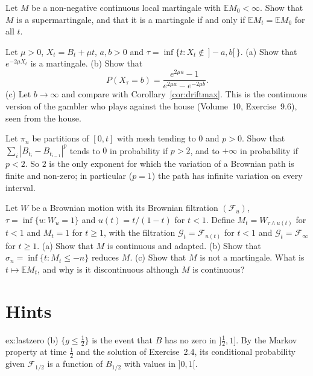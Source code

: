 \begin{exercise}[$\star\star$]\label{ex:superm}
Let $M$ be a non-negative continuous local martingale with $\mathbb EM_0<\infty$. Show that $M$ is a supermartingale, and that it is a martingale if and only if $\mathbb EM_t=\mathbb EM_0$ for all $t$.
\end{exercise}

\begin{exercise}[$\star\star$]\label{ex:driftruin}
Let $\mu>0$, $X_t=B_t+\mu t$, $a,b>0$ and $\tau=\inf\{t:X_t\notin\,]-a,b[\,\}$. (a) Show that $e^{-2\mu X_t}$ is a martingale. (b) Show that
\[
P(X_\tau=b)=\frac{e^{2\mu a}-1}{e^{2\mu a}-e^{-2\mu b}}.
\]
(c) Let $b\to\infty$ and compare with Corollary~\ref{cor:driftmax}. This is the continuous version of the gambler who plays against the house (Volume~10, Exercise~9.6), seen from the house.
\end{exercise}

\begin{exercise}[$\star$]\label{ex:pvariation}
Let $\pi_n$ be partitions of $[0,t]$ with mesh tending to $0$ and $p>0$. Show that $\sum_i|B_{t_i}-B_{t_{i-1}}|^p$ tends to $0$ in probability if $p>2$, and to $+\infty$ in probability if $p<2$. So $2$ is the only exponent for which
the variation of a Brownian path is finite and non-zero; in particular ($p=1$) the path has infinite variation on every interval.
\end{exercise}

\begin{exercise}[$\star\star\star$]\label{ex:strict}
Let $W$ be a Brownian motion with its Brownian filtration $(\mathcal F_u)$, $\tau=\inf\{u:W_u=1\}$ and $u(t)=t/(1-t)$ for $t<1$. Define $M_t=W_{\tau\wedge u(t)}$ for $t<1$ and $M_t=1$ for $t\ge1$, with the
filtration $\mathcal G_t=\mathcal F_{u(t)}$ for $t<1$ and $\mathcal G_t=\mathcal F_\infty$ for $t\ge1$. (a) Show that $M$ is continuous and adapted. (b) Show that $\sigma_n=\inf\{t:M_t\le-n\}$ reduces $M$. (c) Show
that $M$ is not a martingale. What is $t\mapsto\mathbb EM_t$, and why is it discontinuous although $M$ is continuous?
\end{exercise}

\section{Hints}

\begin{hint}{ex:lastzero}
(b) $\{g\le\frac12\}$ is the event that $B$ has no zero in $]\frac12,1]$. By the Markov property at time $\frac12$ and the solution of Exercise~2.4, its conditional probability given $\mathcal F_{1/2}$ is a function of
$B_{1/2}$ with values in $]0,1[$.
\end{hint}


